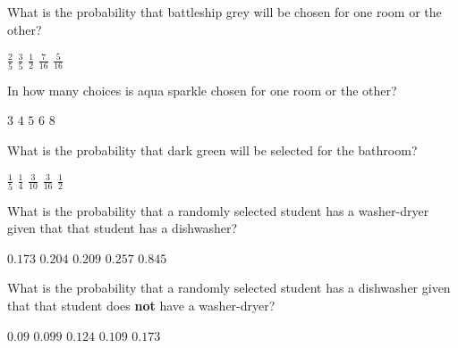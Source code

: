 \documentclass[answers,12pt]{exam}
\begin{document}
\begin{questions}
\question
What is the probability that battleship grey will be chosen
for one room or the other?\\
\begin{oneparchoices}
\choice $\frac{2}{5}$ %
\correctchoice $\frac{3}{5}$
\choice $\frac{1}{2}$ %
\choice $\frac{7}{16}$ %
\choice $\frac{5}{16}$ %
\end{oneparchoices}

\question
In how many choices is aqua sparkle chosen for
one room or the other?\\
\begin{oneparchoices}
\choice $3$
\correctchoice $4$
\choice $5$ %
\choice $6$ %
\choice $8$
\end{oneparchoices}

\question\label{LastColor}
What is the probability that dark green will be selected
for the bathroom?\\
\begin{oneparchoices}
\correctchoice $\frac{1}{5}$
\choice $\frac{1}{4}$ %
\choice $\frac{3}{10}$ %
\choice $\frac{3}{16}$ %
\choice $\frac{1}{2}$ %
\end{oneparchoices}


\question\label{FirstAmes} What is the probability that a randomly selected
student has a washer-dryer given that that student has a dishwasher?\\
\begin{oneparchoices}
\choice $0.173$ %
\correctchoice $0.204$
\choice $0.209$ %
\choice $0.257$ %
\choice $0.845$ %
\end{oneparchoices}

\question\label{LastAmes} What is the probability that a randomly selected
student has a dishwasher given that that student does {\bf not}
have a washer-dryer?\\
\begin{oneparchoices}
\correctchoice $0.09$
\choice $0.099$ %
\choice $0.124$ %
\choice $0.109$ %
\choice $0.173$ %
\end{oneparchoices}


\end{questions}
\end{document}
